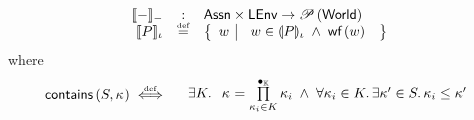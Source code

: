 \begin{definition}
%
\[
\begin{array}{r c l}
\sem[-]{-} & : & \Assertions \times \LEnv \rightarrow \pset{\Worlds} \\

\sem{P} & \eqdef & 
\left\{
\begin{array}{l | l}
 w &
 \begin{array}{l}
 	 w \in \intermediateSem{P} \;\land\;
 	 \wf{w}
 	\end{array} 
\end{array}
\right\}\\
\end{array}
\]
%
where 
%
\[
\begin{array}{l l}
	
	\contains{S}{\ca{}} \iffdef & 
	\begin{array}{l}
		\exsts{K}\;\; \ca{} = \prod\limits_{\ca{i} \in K}^{\composeCap} \ca{i} \;\land\;
		\for{\ca{i} \in K} \exsts{\ca{}' \in S} \ca{i} \leq \ca{}'
	\end{array}
\end{array}
\]
%
\end{definition}
%

